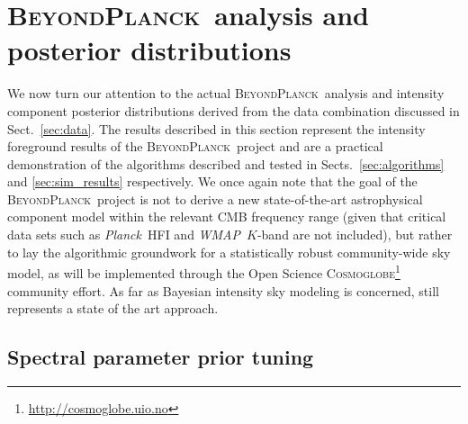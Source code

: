 \documentclass{aa}
\def\Planck{\textit{Planck}}
\def\WMAP{\emph{WMAP}}
\newcommand{\BP}{\textsc{BeyondPlanck}}
\begin{document}
\section{\BP\ analysis and posterior distributions}
\label{sec:results}

We now turn our attention to the actual \BP\ analysis and intensity
component posterior distributions derived from the data combination
discussed in Sect.~\ref{sec:data}.
The results described in this section represent the
intensity foreground results of the \BP\ project and are a practical 
demonstration of the algorithms described and tested in Sects.~\ref{sec:algorithms} and \ref{sec:sim_results} respectively. We once again note that the
goal of the \BP\ project is not to derive a new state-of-the-art
astrophysical component model within the relevant CMB frequency range (given that critical data sets such as
\Planck\ HFI and \WMAP\ $K$-band are not included), but rather to lay
the algorithmic groundwork for a statistically robust community-wide
sky model, as will be implemented through the Open Science
\textsc{Cosmoglobe}\footnote{\url{http://cosmoglobe.uio.no}} community
effort. As far as Bayesian intensity sky modeling is concerned,
\citet{planck2014-a12} still represents a state of the art approach.

\subsection{Spectral parameter prior tuning}
\label{subsec:regions}
\end{document}
